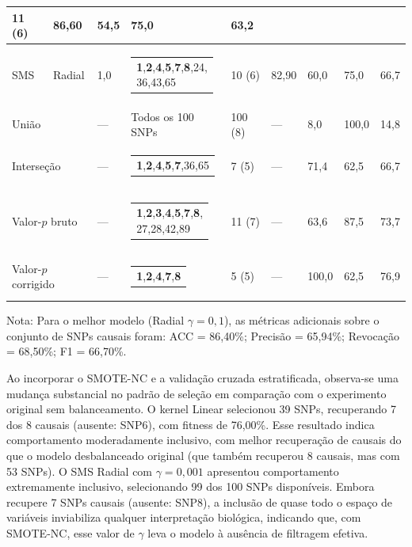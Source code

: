 \documentclass[
    12pt,
    a4paper,
    oneside,
    english,
    french,
    spanish,
    brazil
    ]{abntex2}
\makeatletter
\newcommand{\novo}[1]{\textcolor{corNova}{#1}}
\newcommand{\makecell}[2][t]{\begin{tabular}[#1]{@{}l@{}}#2\end{tabular}}
\makeatother
\begin{document}
\begin{longtable}{L{1.3cm}|L{1.3cm}|C{0.8cm}|L{4.8cm}|C{1.55cm}|C{0.95cm}|C{0.95cm}|C{0.9cm}|C{1.05cm}}
  \novo{11 (6)} & \novo{86,60} & \novo{54,5} & \novo{75,0} & \novo{63,2} \\
\hline
\novo{SMS} & \novo{Radial} & \novo{1,0} &
  \novo{\makecell[l]{\textbf{1},\textbf{2},\textbf{4},\textbf{5},\textbf{7},\textbf{8},24,\\
               36,43,65}} &
  \novo{10 (6)} & \novo{82,90} & \novo{60,0} & \novo{75,0} & \novo{66,7} \\
\hline
\multicolumn{2}{l|}{\novo{União}} & \novo{---} &
  \novo{Todos os 100 SNPs} &
  \novo{100 (8)} & \novo{---} & \novo{8,0} & \novo{100,0} & \novo{14,8} \\
\hline
\multicolumn{2}{l|}{\novo{Interseção}} & \novo{---} &
  \novo{\makecell[l]{\textbf{1},\textbf{2},\textbf{4},\textbf{5},\textbf{7},36,65}} &
  \novo{7 (5)} & \novo{---} & \novo{71,4} & \novo{62,5} & \novo{66,7} \\
\hline
\multicolumn{2}{l|}{\novo{Valor-$p$ bruto}} & \novo{---} &
  \novo{\makecell[l]{\textbf{1},\textbf{2},\textbf{3},\textbf{4},\textbf{5},\textbf{7},\textbf{8},\\
               27,28,42,89}} &
  \novo{11 (7)} & \novo{---} & \novo{63,6} & \novo{87,5} & \novo{73,7} \\
\hline
\multicolumn{2}{l|}{\novo{Valor-$p$ corrigido}} & \novo{---} &
  \novo{\makecell[l]{\textbf{1},\textbf{2},\textbf{4},\textbf{7},\textbf{8}}} &
  \novo{5 (5)} & \novo{---} & \novo{100,0} & \novo{62,5} & \novo{76,9} \\
\hline
\end{longtable}





\novo{Nota: Para o melhor modelo (Radial $\gamma = 0{,}1$), as métricas adicionais sobre o conjunto de SNPs causais foram: ACC = 86,40\%; Precisão = 65,94\%; Revocação = 68,50\%; F1 = 66,70\%.}

\novo{Ao incorporar o SMOTE-NC e a validação cruzada estratificada, observa-se uma mudança substancial no padrão de seleção em comparação com o experimento original sem balanceamento. O kernel Linear selecionou 39 SNPs, recuperando 7 dos 8 causais (ausente: SNP6), com fitness de 76,00\%. Esse resultado indica comportamento moderadamente inclusivo, com melhor recuperação de causais do que o modelo desbalanceado original (que também recuperou 8 causais, mas com 53 SNPs). O SMS Radial com $\gamma = 0{,}001$ apresentou comportamento extremamente inclusivo, selecionando 99 dos 100 SNPs disponíveis. Embora recupere 7 SNPs causais (ausente: SNP8), a inclusão de quase todo o espaço de variáveis inviabiliza qualquer interpretação biológica, indicando que, com SMOTE-NC, esse valor de $\gamma$ leva o modelo à ausência de filtragem efetiva.}
\end{document}
